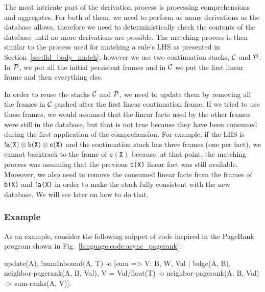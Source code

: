 The most intricate part of the derivation process is processing comprehensions
and aggregates. For both of them, we need to perform as many derivations as the
database allows, therefore we need to deterministically check the contents of
the database until no more derivations are possible.  The matching process is
then similar to the process used for matching a rule's LHS as presented in
Section~\ref{sec:lld_body_match}, however we use two continuation stacks,
$\mathcal{C}$ and $\mathcal{P}$. In $\mathcal{P}$, we put all the initial
persistent frames and in $\mathcal{C}$ we put the first linear frame and then
everything else.

In order to reuse the stacks $\mathcal{C}$ and $\mathcal{P}$, we need to update
them by removing all the frames in $\mathcal{C}$ pushed after the first linear
continuation frame.  If we tried to use those frames, we would assumed that the
linear facts used by the other frames were still in the database, but that is
not true because they have been consumed during the first application of the
comprehension.  For example, if the LHS is ${!} \mathtt{a(X)} \otimes
\mathtt{b(X)} \otimes \mathtt{c(X)}$ and the continuation stack has three frames
(one per fact), we cannot backtrack to the frame of $\mathtt{c(X)}$ because, at
that point, the matching process was assuming that the previous \texttt{b(X)}
linear fact was still available.  Moreover, we also need to remove the consumed
linear facts from the frames of \texttt{b(X)} and ${!}$\texttt{a(X)} in order
to make the stack fully consistent with the new database. We will see later on
how to do that.

\subsubsection{Example}

As an example, consider the following snippet of code inspired in the PageRank
program shown in Fig.~\ref{language:code:async_pagerank}:

\begin{Code}
update(A),
!numInbound(A, T)
   -o [sum => V; B, W, Val | !edge(A, B), neighbor-pagerank(A, B, Val),
         V = Val/float(T) -o neighbor-pagerank(A, B, Val) -> sum-ranks(A, V)].
\end{Code}

